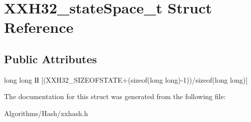 \hypertarget{structXXH32__stateSpace__t}{\section{X\-X\-H32\-\_\-state\-Space\-\_\-t Struct Reference}
\label{structXXH32__stateSpace__t}
}
\subsection*{Public Attributes}
\begin{DoxyCompactItemize}
\item 
\hypertarget{structXXH32__stateSpace__t_a7e66f0e3bbe805d5694f615e6a3fd878}{long long {\bfseries ll} \mbox{[}(X\-X\-H32\-\_\-\-S\-I\-Z\-E\-O\-F\-S\-T\-A\-T\-E+(sizeof(long long)-\/1))/sizeof(long long)\mbox{]}}\label{structXXH32__stateSpace__t_a7e66f0e3bbe805d5694f615e6a3fd878}

\end{DoxyCompactItemize}


The documentation for this struct was generated from the following file\-:\begin{DoxyCompactItemize}
\item 
Algorithms/\-Hash/xxhash.\-h\end{DoxyCompactItemize}
